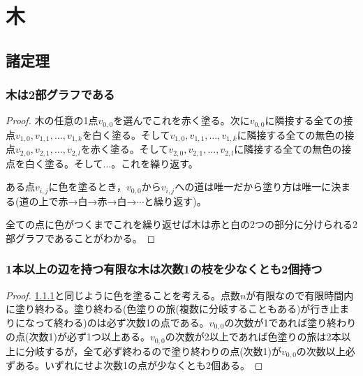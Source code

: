 \chapter{木}
    \section{諸定理}
        \subsection{木は2部グラフである}
            \label{subsec:木は2部グラフである}
            \begin{proof}
                木の任意の1点$v_{0,0}$を選んでこれを赤く塗る。次に$v_{0,0}$に隣接する全ての接点$v_{1,0},v_{1,1},\dotsc,v_{1,k}$を白く塗る。そして$v_{1,0},v_{1,1},\dotsc,v_{1,k}$に隣接する全ての無色の接点$v_{2,0},v_{2,1},\dotsc,v_{2,l}$を赤く塗る。そして$v_{2,0},v_{2,1},\dotsc,v_{2,l}$に隣接する全ての無色の接点を白く塗る。そして...。これを繰り返す。
                \par
                ある点$v_{i,j}$に色を塗るとき，$v_{0,0}$から$v_{i,j}$への道は唯一だから塗り方は唯一に決まる(道の上で赤→白→赤→白→$\dotsb$と繰り返す)。
                \par
                全ての点に色がつくまでこれを繰り返せば木は赤と白の2つの部分に分けられる2部グラフであることがわかる。
            \end{proof}
        \subsection{1本以上の辺を持つ有限な木は次数1の枝を少なくとも2個持つ}
            \begin{proof}
                \ref{subsec:木は2部グラフである}と同じように色を塗ることを考える。点数$n$が有限なので有限時間内に塗り終わる。塗り終わる(色塗りの旅(複数に分岐することもある)が行き止まりになって終わる)のは必ず次数1の点である。$v_{0,0}$の次数が1であれば塗り終わりの点(次数1)が必ず1つ以上ある。$v_{0,0}$の次数が2以上であれば色塗りの旅は2本以上に分岐するが，全て必ず終わるので塗り終わりの点(次数1)が$v_{0,0}$の次数以上必ずある。いずれにせよ次数1の点が少なくとも2個ある。
            \end{proof}
